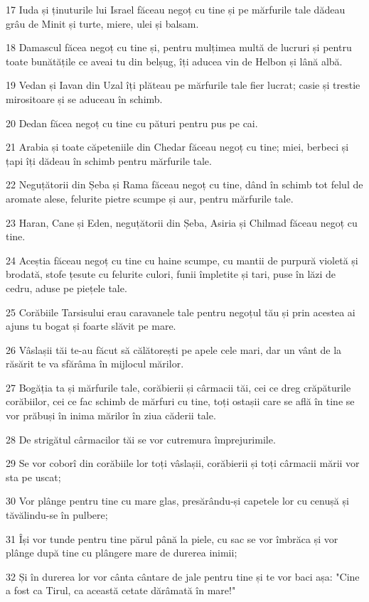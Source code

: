 \par 17 Iuda și ținuturile lui Israel făceau negoț cu tine și pe mărfurile tale dădeau grâu de Minit și turte, miere, ulei și balsam.
\par 18 Damascul făcea negoț cu tine și, pentru mulțimea multă de lucruri și pentru toate bunătățile ce aveai tu din belșug, îți aducea vin de Helbon și lână albă.
\par 19 Vedan și Iavan din Uzal îți plăteau pe mărfurile tale fier lucrat; casie și trestie mirositoare și se aduceau în schimb.
\par 20 Dedan făcea negoț cu tine cu pături pentru pus pe cai.
\par 21 Arabia și toate căpeteniile din Chedar făceau negoț cu tine; miei, berbeci și țapi îți dădeau în schimb pentru mărfurile tale.
\par 22 Neguțătorii din Șeba și Rama făceau negoț cu tine, dând în schimb tot felul de aromate alese, felurite pietre scumpe și aur, pentru mărfurile tale.
\par 23 Haran, Cane și Eden, neguțătorii din Șeba, Asiria și Chilmad făceau negoț cu tine.
\par 24 Aceștia făceau negoț cu tine cu haine scumpe, cu mantii de purpură violetă și brodată, stofe țesute cu felurite culori, funii împletite și tari, puse în lăzi de cedru, aduse pe piețele tale.
\par 25 Corăbiile Tarsisului erau caravanele tale pentru negoțul tău și prin acestea ai ajuns tu bogat și foarte slăvit pe mare.
\par 26 Vâslașii tăi te-au făcut să călătorești pe apele cele mari, dar un vânt de la răsărit te va sfărâma în mijlocul mărilor.
\par 27 Bogăția ta și mărfurile tale, corăbierii și cârmacii tăi, cei ce dreg crăpăturile corăbiilor, cei ce fac schimb de mărfuri cu tine, toți ostașii care se află în tine se vor prăbuși în inima mărilor în ziua căderii tale.
\par 28 De strigătul cârmacilor tăi se vor cutremura împrejurimile.
\par 29 Se vor coborî din corăbiile lor toți vâslașii, corăbierii și toți cârmacii mării vor sta pe uscat;
\par 30 Vor plânge pentru tine cu mare glas, presărându-și capetele lor cu cenușă și tăvălindu-se în pulbere;
\par 31 Își vor tunde pentru tine părul până la piele, cu sac se vor îmbrăca și vor plânge după tine cu plângere mare de durerea inimii;
\par 32 Și în durerea lor vor cânta cântare de jale pentru tine și te vor baci așa: "Cine a fost ca Tirul, ca această cetate dărâmată în mare!"
